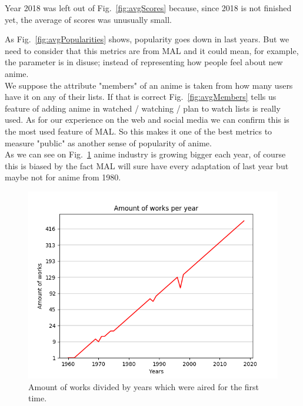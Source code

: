 Year 2018 was left out of Fig.~\ref{fig:avgScores} because, since 2018 is not finished yet, the average of scores was unusually small.

As Fig.~\ref{fig:avgPopularities} shows, popularity goes down in last years. But we need to consider that this metrics are from MAL and it could mean, for example, the parameter is in disuse; instead of representing how people feel about new anime.\\

We suppose the attribute "members" of an anime is taken from how many users have it on any of their lists. If that is correct Fig.~\ref{fig:avgMembers} tells us feature of adding anime in watched / watching / plan to watch lists is really used. As for our experience on the web and social media we can confirm this is the most used feature of MAL. So this makes it one of the best metrics to measure "public" as another sense of popularity of anime.\\

As we can see on Fig.~\ref{fig:amountOfWorksPerYear} anime industry is growing bigger each year, of course this is biased by the fact MAL will sure have every adaptation of last year but maybe not for anime from 1980.

\begin{figure}[!h]
	\begin{center}
	\includegraphics[width=\columnwidth]{graphics/worksPerYear_1960-2018.png}
	\caption{Amount of works divided by years which were aired for the first time.}
	\label{fig:amountOfWorksPerYear}
	\end{center}
\end{figure}

